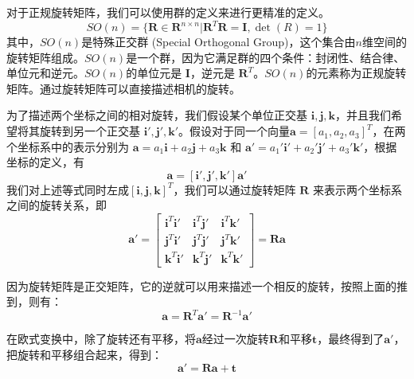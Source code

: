 对于正规旋转矩阵，我们可以使用群的定义来进行更精准的定义。
\begin{equation}
    SO(n) = \{\boldsymbol{R} \in \boldsymbol{R}^{n \times n} | \boldsymbol{R}^T\boldsymbol{R} = \boldsymbol{I}, \det (R) = 1\}
\end{equation}
其中，$SO(n)$是特殊正交群 (Special Orthogonal Group)，这个集合由$n$维空间的旋转矩阵组成。$SO(n)$是一个群，因为它满足群的四个条件：封闭性、结合律、单位元和逆元。$SO(n)$的单位元是 $\boldsymbol{I}$，逆元是 $\boldsymbol{R}^T$。$SO(n)$的元素称为正规旋转矩阵。通过旋转矩阵可以直接描述相机的旋转。

为了描述两个坐标之间的相对旋转，我们假设某个单位正交基 $\boldsymbol{i}, \boldsymbol{j}, \boldsymbol{k}$，并且我们希望将其旋转到另一个正交基 $\boldsymbol{i}', \boldsymbol{j}', \boldsymbol{k}'$。假设对于同一个向量$\boldsymbol{a} = [a_1, a_2, a_3]^T$，在两个坐标系中的表示分别为 $\boldsymbol{a} = a_1\boldsymbol{i} + a_2\boldsymbol{j} + a_3\boldsymbol{k}$ 和 $\boldsymbol{a}' = a_1'\boldsymbol{i}' + a_2'\boldsymbol{j}' + a_3'\boldsymbol{k}'$，根据坐标的定义，有
\begin{equation}
    [\boldsymbol{i}, \boldsymbol{j}, \boldsymbol{k}] \boldsymbol{a} = [\boldsymbol{i}', \boldsymbol{j}', \boldsymbol{k}'] \boldsymbol{a}'
\end{equation}
我们对上述等式同时左成$[\boldsymbol{i}, \boldsymbol{j}, \boldsymbol{k}]^T$，我们可以通过旋转矩阵 $\boldsymbol{R}$ 来表示两个坐标系之间的旋转关系，即
\begin{equation}
    \boldsymbol{a}' = 
    \begin{bmatrix}
    \boldsymbol{i}^T \boldsymbol{i}' & \boldsymbol{i}^T \boldsymbol{j}' & \boldsymbol{i}^T \boldsymbol{k}' \\
    \boldsymbol{j}^T \boldsymbol{i}' & \boldsymbol{j}^T \boldsymbol{j}' & \boldsymbol{j}^T \boldsymbol{k}' \\
    \boldsymbol{k}^T \boldsymbol{i}' & \boldsymbol{k}^T \boldsymbol{j}' & \boldsymbol{k}^T \boldsymbol{k}'
    \end{bmatrix}
    =
    \boldsymbol{R} \boldsymbol{a}
\end{equation}

因为旋转矩阵是正交矩阵，它的逆就可以用来描述一个相反的旋转，按照上面的推到，则有：
\begin{equation}
    \boldsymbol{a} = \boldsymbol{R}^T \boldsymbol{a}' = \boldsymbol{R}^{-1} \boldsymbol{a}'
\end{equation}

在欧式变换中，除了旋转还有平移，将$\boldsymbol{a}$经过一次旋转$\boldsymbol{R}$和平移$\boldsymbol{t}$，最终得到了$\boldsymbol{a}'$，把旋转和平移组合起来，得到：
\begin{equation}
    \boldsymbol{a}' = \boldsymbol{R} \boldsymbol{a} + \boldsymbol{t}
    \label{eq:rotation_translation}
\end{equation}

